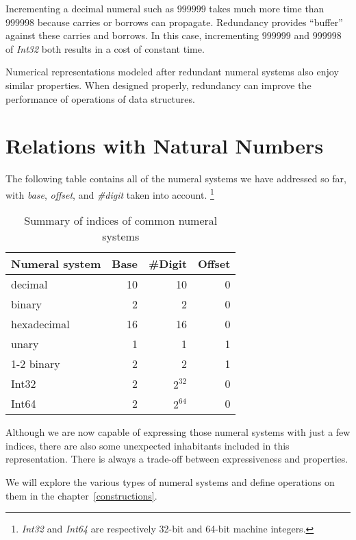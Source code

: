\documentclass[\main/thesis.tex]{subfiles}
\begin{document}
Incrementing a decimal numeral such as $ 999999 $ takes much more time than
$ 999998 $ because carries or borrows can propagate.
Redundancy provides ``buffer'' against these carries and borrows.
In this case, incrementing $ 999999 $ and $ 999998 $ of \textit{Int32} both
results in a cost of constant time.

Numerical representations modeled after redundant numeral systems also enjoy
similar properties. When designed properly, redundancy can improve the performance
of operations of data structures.


\section{Relations with Natural Numbers}

The following table contains all of the numeral systems we have addressed so far,
with \textit{base}, \textit{offset}, and \textit{\#digit} taken into account.
\footnote{
\textit{Int32} and \textit{Int64} are respectively 32-bit and 64-bit machine
integers.
}

\begin{table}[H]
    \centering
    \begin{adjustbox}{max width=\textwidth}
    \begin{tabular}{ | l | r | r | r | }
    \textbf{Numeral system} & \textbf{Base} & \textbf{\#Digit} & \textbf{Offset} \\
    \hline
    decimal         & 10 & 10 & 0 \\
    binary          & 2  & 2  & 0 \\
    hexadecimal     & 16 & 16 & 0 \\
    unary           & 1  & 1  & 1 \\
    1-2 binary      & 2  & 2  & 1 \\
    Int32           & 2  & $ 2^{32} $ & 0 \\
    Int64           & 2  & $ 2^{64} $ & 0 \\
    \end{tabular}
    \end{adjustbox}
\caption{Summary of indices of common numeral systems}
\label{table:9}
\end{table}


Although we are now capable of expressing those numeral systems with just a few
indices, there are also some unexpected inhabitants included in this representation.
There is always a trade-off between expressiveness and properties.

We will explore the various types of numeral systems and define operations on
them in the chapter~\ref{constructions}.
\end{document}
